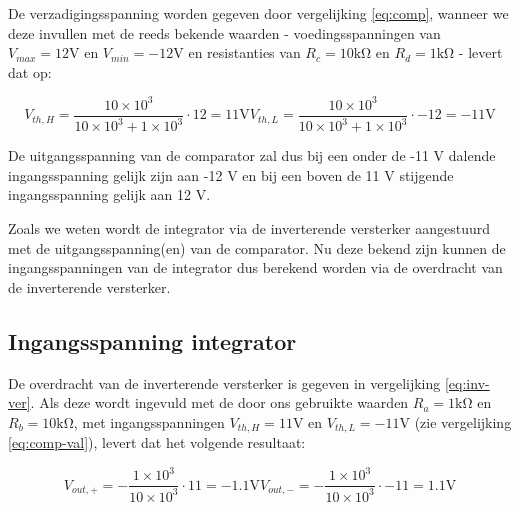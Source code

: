 \documentclass{report}
\begin{document}
De verzadigingsspanning worden gegeven door vergelijking \ref{eq:comp}, wanneer we deze invullen met de reeds bekende waarden - voedingsspanningen van $V_{max} = 12 \mathrm{V}$ en $V_{min}= −12 \mathrm{V}$ en resistanties van $R_{c} = 10 \mathrm{k\Omega}$ en $R_{d} = 1 \mathrm{k\Omega}$ - levert dat op:

\begin{subequations}
	\begin{equation}
		V_{th,H} = \frac{10 \times 10^{3}}{10 \times 10^{3} + 1 \times 10^{3}} \cdot 12 = 11 \mathrm{V}
	\label{eq:comp-H-val}
	\end{equation}

	\begin{equation}
		V_{th,L} = \frac{10 \times 10^{3}}{10 \times 10^{3} + 1 \times 10^{3}} \cdot -12 = -11 \mathrm{V}
		\label{eq:comp-L-val}
	\end{equation}
	\label{eq:comp-val}
\end{subequations}

\noindent
De uitgangsspanning van de comparator zal dus bij een onder de -11 V dalende ingangsspanning gelijk zijn aan -12 V en bij een boven de 11 V stijgende ingangsspanning gelijk aan 12 V. 

Zoals we weten wordt de integrator via de inverterende versterker aangestuurd met de uitgangsspanning(en) van de comparator. Nu deze bekend zijn kunnen de ingangsspanningen van de integrator dus berekend worden via de overdracht van de inverterende versterker.

\subsection{Ingangsspanning integrator}

De overdracht van de inverterende versterker is gegeven in vergelijking \ref{eq:inv-ver}. Als deze wordt ingevuld met de door ons gebruikte waarden $R_{a}= 1 \mathrm{k\Omega}$ en $R_{b}= 10\mathrm{k\Omega}$, met ingangsspanningen $V_{th,H} = 11 \mathrm{V}$ en $V_{th,L} = -11 \mathrm{V}$ (zie vergelijking \ref{eq:comp-val}), levert dat het volgende resultaat:

\begin{subequations}
	\begin{equation}
		V_{out,+} = -\frac{1 \times 10^{3}}{10 \times 10^{3}} \cdot 11 = -1.1 \mathrm{V}
		\label{eq:inv-ver-val-pos}
	\end{equation}

	\begin{equation}
		V_{out,-} = -\frac{1 \times 10^{3}}{10 \times 10^{3}} \cdot -11 = 1.1 \mathrm{V}
		\label{eq:inv-ver-val-neg}
	\end{equation}
	\label{eq:inv-ver-val}
\end{subequations}
\end{document}
